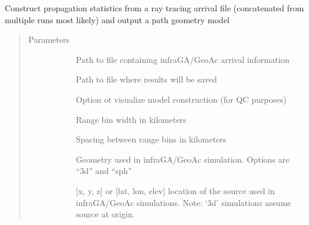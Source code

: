 \documentclass[letterpaper,10pt,english]{sphinxmanual}
\begin{document}
\begin{fulllineitems}
\begin{fulllineitems}
\label{\detokenize{stochprop.propagation:stochprop.propagation.PathGeometryModel.build}}
\sphinxAtStartPar
Construct propagation statistics from a ray tracing arrival file (concatenated from
multiple runs most likely) and output a path geometry model
\begin{quote}\begin{description}
\item[{Parameters}] \leavevmode\begin{description}
\item[{}] \leavevmode
\sphinxAtStartPar
Path to file containing infraGA/GeoAc arrival information

\item[{}] \leavevmode
\sphinxAtStartPar
Path to file where results will be saved

\item[{}] \leavevmode
\sphinxAtStartPar
Option ot visualize model construction (for QC purposes)

\item[{}] \leavevmode
\sphinxAtStartPar
Range bin width in kilometers

\item[{}] \leavevmode
\sphinxAtStartPar
Spacing between range bins in kilometers

\item[{}] \leavevmode
\sphinxAtStartPar
Geometry used in infraGA/GeoAc simulation.  Options are “3d” and “sph”

\item[{}] \leavevmode
\sphinxAtStartPar
{[}x, y, z{]} or {[}lat, lon, elev{]} location of the source used in infraGA/GeoAc simulations.  Note: ‘3d’ simulations assume source at origin.


\end{description}
\end{description}
\end{quote}
\end{fulllineitems}
\end{fulllineitems}
\end{document}
